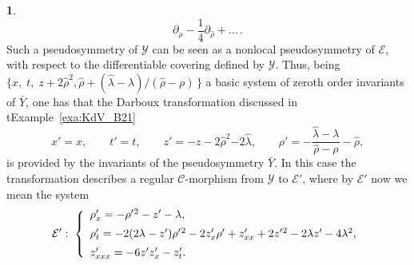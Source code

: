 \documentclass[12pt,english]{elsarticle}
\theoremstyle{plain}
\theoremstyle{plain}
\theoremstyle{remark}
\theoremstyle{plain}
\theoremstyle{definition}
\theoremstyle{definition}
\newtheorem{example}[thm]{\protect\examplename}
\providecommand{\examplename}{Example}
\begin{document}
\begin{example}
\begin{equation*}
\partial _{\rho}-\frac{1}{4}\partial _{\hat{\rho}}+\ldots \,.
\end{equation*}
%
Such a pseudosymmetry of $\mathcal{Y}$ can be seen as a nonlocal pseudosymmetry
of $\mathcal{E}$, with respect to the differentiable covering defined by
$\mathcal{Y}$. Thus, being
$\{x,\;t,\;z+2\hat{\rho}^{2},\hat{\rho}+(\hat{\lambda}-\lambda )/(
\hat{\rho}-\rho )\,\}$ a basic system of zeroth order invariants of
$\bar{Y}$, one has that the Darboux transformation discussed in t{Example~\ref{exa:KdV_B21}}
%
\begin{equation*}
x'=x,\qquad t'=t,\qquad z'=-z-2\hat{\rho}^{2}{-2
\hat{\lambda}},\qquad \rho '=-
\frac{\hat{\lambda}-\lambda}{\hat{\rho}-\rho}-\hat{\rho},
\end{equation*}
%
is provided by the invariants of the pseudosymmetry $\bar{Y}$. In this
case the transformation describes a regular $\mathcal{C}$-morphism from
$\mathcal{Y}$ to $\mathcal{E}'$, where by $\mathcal{E}'$ now we mean the
system
%
\begin{equation*}
\mathcal{E}':\;\left \{
%
\begin{array}{l}
\rho '_{x}=-\rho '{}^{2}-z'-\lambda ,
\vspace{5pt}
\\
\rho '_{t}=-2(2\lambda -z')\rho '{}^{2}-2z'_{x}\rho '+z'_{xx}+2z'{}^{2}-2
\lambda z'-4\lambda ^{2},
\vspace{5pt}
\\
z'_{xxx}=-6z'z'_{x}-z'_{t}.
\end{array}
%
\right .
\end{equation*}
%
\end{example}
\end{document}
